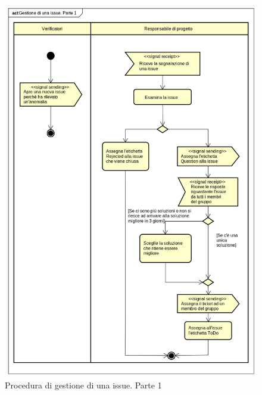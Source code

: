 \documentclass[../NormeProgetto.text]{subfiles}
\begin{document}
				\begin{figure}[H]
					\centering
					\includegraphics[scale= 0.75, width=\textwidth]{sections/img/gestioneIssueP1.png}
					\caption{Procedura di gestione di una issue. Parte 1}\label{fig:Procedura di gestione di una nuova issue parte 1} 
				\end{figure}
\end{document}
